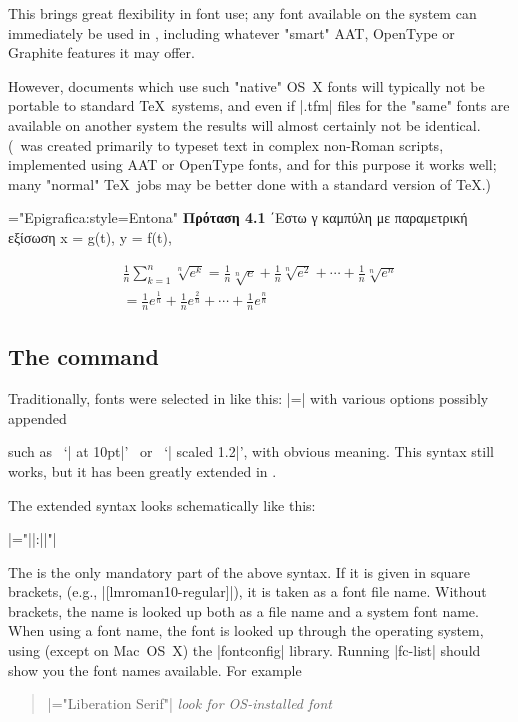 This brings great flexibility in font use; any font available on the system can immediately be used in \XeTeX, including whatever "smart" AAT, OpenType or Graphite features it may offer.

However, documents which use such "native" OS~X fonts will typically not be portable to standard \TeX\ systems, and even if |.tfm| files for the "same" fonts are available on another system the results will almost certainly not be identical. (\XeTeX\ was created primarily to typeset text in complex non-Roman scripts, implemented using AAT or OpenType fonts, and for this purpose it works well; many "normal" \TeX\ jobs may be better done with a standard version of \TeX.)

\begin{codeexample}[vbox]
{
\font\x="Epigrafica:style=Entona" \x
\textbf{Πρόταση 4.1} ΄Εστω γ καμπύλη με παραμετρική εξίσωση x = g(t), y = f(t),

\begin{eqnarray}\frac{1}{n}\sum_{k=1}^{n}\sqrt[n]{e^k} =
\frac{1}{n}\sqrt[n]{e}+\frac{1}{n}\sqrt[n]{e^2}+\cdots +
\frac{1}{n}\sqrt[n]{e^n}\nonumber\\
=\frac{1}{n}e^{\frac{1}{n}}+\frac{1}{n}e^{\frac{2}{n}}+\cdots+\frac{1}{n}e^{\frac{n}{n}}\nonumber
\end{eqnarray}
}
\end{codeexample}





\subsection{The  command}

Traditionally, fonts were selected in \tex like this:
|\font\1=| with various options possibly appended

such as \ ‘| at 10pt|’ \ or \ ‘| scaled 1.2|’, with obvious meaning. This syntax
still works, but it has been greatly extended in \XeTeX.

The extended syntax looks schematically like this:
\smallskip

{\centering
 |\font\1="||:||"|
 \par}


\noindent The  is the only mandatory part of the
above syntax.  If it is given in square brackets, (e.g.,
|[lmroman10-regular]|), it is taken as a font file name.
Without brackets, the name is looked up both as a file name and a system
font name.
When using a font name, the font is looked up through the operating
system, using (except on Mac~OS~X) the |fontconfig| library.  Running
|fc-list| should show you the font names available.  For example 
\begin{quote}\small
|\font\1="Liberation Serif"| \hfill \emph{look for OS-installed font}
\end{quote}

